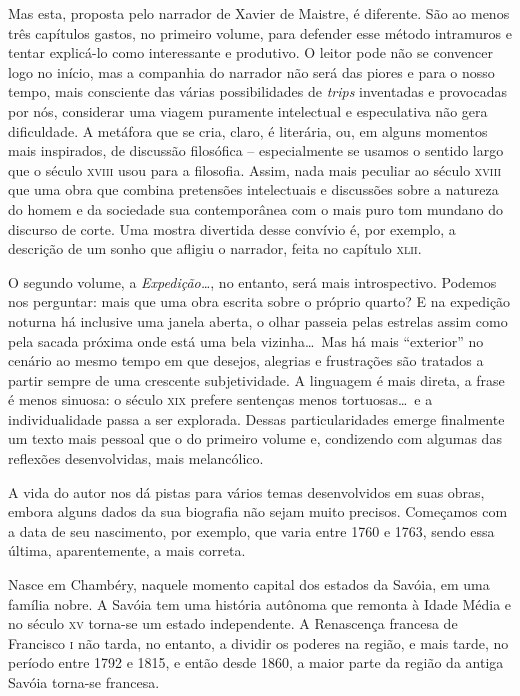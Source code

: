 Mas esta, proposta pelo narrador de Xavier de Maistre, é diferente. São
ao menos três capítulos gastos, no primeiro volume, para defender esse
método intramuros e tentar explicá-lo como interessante e produtivo. O
leitor pode não se convencer logo no início, mas a companhia do
narrador não será das piores e para o nosso tempo, mais consciente das
várias possibilidades de \textit{trips} inventadas e provocadas por
nós, considerar uma viagem puramente intelectual e especulativa não
gera dificuldade. A metáfora que se cria, claro, é literária, ou, em
alguns momentos mais inspirados, de discussão filosófica --
especialmente se usamos o sentido largo que o século \textsc{xviii} usou para a        %
filosofia. Assim, nada mais peculiar ao século \textsc{xviii} que uma obra que combina
pretensões intelectuais e discussões sobre a natureza do homem e da
sociedade sua contemporânea com o mais puro tom mundano do discurso de                %
corte. Uma mostra divertida desse convívio é, por exemplo, a descrição
de um sonho que afligiu o narrador, feita no capítulo \textsc{xlii}.

 O segundo volume, a \textit{Expedição\ldots}, no entanto, será mais
introspectivo. Podemos nos perguntar: mais que uma obra escrita sobre o
próprio quarto? E na expedição noturna há inclusive uma janela aberta,
o olhar passeia pelas estrelas assim como pela sacada próxima onde está
uma bela vizinha\ldots\ Mas há mais ``exterior'' no cenário ao mesmo tempo em
que desejos, alegrias e frustrações são tratados a partir sempre de uma
crescente subjetividade. A linguagem é mais direta, a frase é menos
sinuosa: o século \textsc{xix} prefere sentenças menos tortuosas\ldots\ e a
individualidade passa a ser explorada. Dessas particularidades emerge
finalmente um texto mais pessoal que o do primeiro volume e, condizendo
com algumas das reflexões desenvolvidas, mais melancólico. 

A vida do autor nos dá pistas para vários temas desenvolvidos em suas
obras, embora alguns dados da sua biografia não sejam muito precisos.
Começamos com a data de seu nascimento, por exemplo, que varia entre
1760 e 1763, sendo essa última, aparentemente, a mais correta. 

Nasce em Chambéry, naquele momento capital dos estados da Savóia, em uma
família nobre. A Savóia tem uma história autônoma que remonta à Idade
Média e no século \textsc{xv} torna-se um estado independente. A Renascença
francesa de Francisco \textsc{i} não tarda, no entanto, a dividir os poderes na
região, e mais tarde, no período entre 1792 e 1815, e então desde 1860,
a maior parte da região da antiga Savóia torna-se francesa. 

